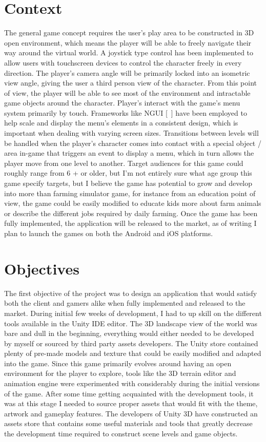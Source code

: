 \section{Context}
The general game concept requires the user's play area to be constructed in 3D open environment, which means the player will be able to freely navigate their way around the virtual world. A joystick type control has been implemented to allow users with touchscreen devices to control the character freely in every direction. The player's camera angle will be primarily locked into an isometric view angle, giving the user a third person view of the character. From this point of view, the player will be able to see most of the environment and intractable game objects around the character. Player's interact with the game's menu system primarily by touch. Frameworks like NGUI [~\cite{NGUI}] have been employed to help scale and display the menu's elements in a consistent design, which is important when dealing with varying screen sizes. Transitions between levels will be handled when the player’s character comes into contact with a special object / area in-game that triggers an event to display a menu, which in turn allows the player move from one level to another. 
Target audiences for this game could roughly range from 6 + or older, but I'm not entirely sure what age group this game specify targets, but I believe the game has potential to grow and develop into more than farming simulator game, for instance from an education point of view, the game could be easily modified to educate kids more about farm animals or describe the different jobs required by daily farming.
Once the game has been fully implemented, the application will be released to the market, as of writing I plan to launch the games on both the Android and iOS platforms.
\section{Objectives}
The first objective of the project was to design an application that would satisfy both the client and gamers alike when fully implemented and released to the market. During initial few weeks of development, I had to up skill on the different tools available in the Unity IDE editor. The 3D landscape view of the world was bare and dull in the beginning, everything would either needed to be developed by myself or sourced by third party assets developers. The Unity store contained plenty of pre-made models and texture that could be easily modified and adapted into the game.
Since this game primarily evolves around having an open environment for the player to explore, tools like the 3D terrain editor and animation engine were experimented with considerably during the initial versions of the game. 
After some time getting acquainted with the development tools, it was at this stage I needed to source proper assets that would fit with the theme, artwork and gameplay features. The developers of Unity 3D have constructed an assets store that contains some useful materials and tools that greatly decrease the development time required to construct scene levels and game objects.
